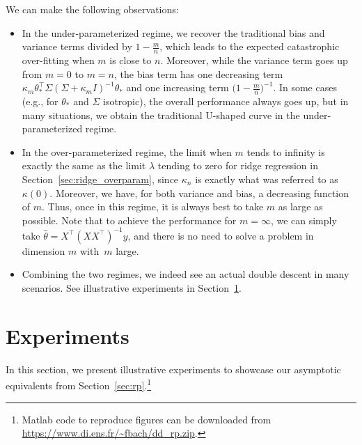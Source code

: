 \documentclass[11pt]{article}
\newcommand{\BIT}{\begin{itemize}}
\newcommand{\EIT}{\end{itemize}}
\newcommand{\idm}{I}
\newcommand{\mysec}[1]{Section~\ref{sec:#1}}
\def \S{  { \Sigma} }
\begin{document}
We can make the following observations:
\BIT
\item In the under-parameterized regime, we recover the traditional bias and variance terms divided by $ 1 - \frac{m}{n} $, which leads to the expected catastrophic over-fitting when $m$ is close to $n$. Moreover, while the variance term goes up from $m=0$ to $m=n$, the bias term has one decreasing term
$\kappa_m \theta_\ast^\top \S ( \S + \kappa_m \idm)^{-1} \theta_\ast$ and one increasing term $\big(1 - \frac{m}{n}\big)^{-1}$. In some cases (e.g., for $\theta_\ast$ and $\Sigma$ isotropic), the overall performance always goes up, but in many situations, we obtain the traditional U-shaped curve in the under-parameterized regime.

\item In the over-parameterized regime, the limit when $m$ tends to infinity is exactly the same as the limit $\lambda$ tending to zero for ridge regression in \mysec{ridge_overparam}, since $\kappa_n$ is exactly what was referred to as $\kappa(0)$. Moreover, we have, for both variance and bias, a decreasing function of $m$. Thus, once in this regime, it is always best to take $m$ as large as possible. Note that to achieve the performance for $m=\infty$, we can simply take $\hat{\theta} = X^\top ( XX^\top )^{-1} y$, and there is no need to solve a problem in dimension $m$ with~$m$ large.

\item Combining the two regimes, we indeed see an actual double descent in many scenarios. See illustrative experiments in \mysec{experiments}.
 \EIT

\section{Experiments}
\label{sec:experiments}

In this section, we present illustrative experiments to showcase our asymptotic equivalents from \mysec{rp}.\footnote{Matlab code to reproduce figures can be downloaded from {\small \url{https://www.di.ens.fr/~fbach/dd_rp.zip}}.}
 
\end{document}
